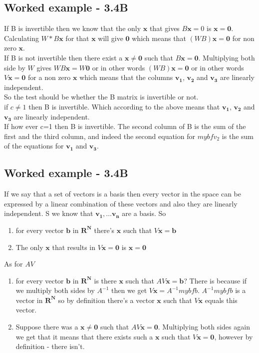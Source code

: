 \documentclass[a4paper,11pt]{article}
\newcommand{\mybf}[1]{\boldsymbol{#1}}
\begin{document}
\subsection*{Worked example - 3.4B}
If B is invertible then we know that the only $\mybf{x}$ that gives $B\mybf{x}=0$ is $\mybf{x}=\mybf{0}$. Calculating $W*B\mybf{x}$ for that $\mybf{x}$ will give $\mybf{0}$ which means that $(WB)\mybf{x}=\mybf{0}$ for non zero $\mybf{x}$. \\
If B is not invertible then there exist a $\mybf{x} \ne \mybf{0}$ such that $B\mybf{x}=\mybf{0}$. Multiplying both side by $W$ gives $WB\mybf{x}=W\mybf{0}$ or in other words $(WB)\mybf{x}=\mybf{0}$ or in other words $V\mybf{x}=\mybf{0}$ for a non zero $\mybf{x}$ which means that the columns $\mybf{v_1}$, $\mybf{v_2}$ and $\mybf{v_3}$ are linearly independent.\\
So the test should be whether the B matrix is invertible or not.\\
if $c \ne 1$ then B is invertible. Which according to the above means that $\mybf{v_1}$, $\mybf{v_2}$ and $\mybf{v_3}$ are linearly independent.\\
If how ever c=1 then B is invertible. The second column of B is the sum of the first and the third column, and indeed the second equation for $mybf{v_2}$ is the sum of the equations for $\mybf{v_1}$ and $\mybf{v_3}$.
\subsection*{Worked example - 3.4B}
If we say that a set of vectors is a basis then every vector in the space can be expressed by a linear combination of these vectors and also they are linearly independent.
S we know that $\mybf{v_1}, \dots \mybf{v_n}$ are a basis. So 
\begin{enumerate}
\item for every vector $\mybf{b}$ in $\mybf{R^N}$ there's $\mybf{x}$ such that $V\mybf{x}=\mybf{b}$
\item The only $\mybf{x}$ that results in $V\mybf{x}=\mybf{0}$ is $\mybf{x}=\mybf{0}$
\end{enumerate}
As for $AV$
\begin{enumerate}
\item for every vector $\mybf{b}$ in $\mybf{R^N}$ is there $\mybf{x}$ such that $AV\mybf{x}=\mybf{b}$? There is because if we multiply both sides by $A^{-1}$ then we get $V\mybf{x}=A^{-1}mybf{b}$. $A^{-1}mybf{b}$ is a vector in $\mybf{R^N}$ so by definition there's a vector $\mybf{x}$ such that $V\mybf{x}$ equals this vector.
\item Suppose there was a $\mybf{x} \ne \mybf{0}$ such that $AV\mybf{x}=\mybf{0}$. Multiplying both sides again we get that it means that there exists  such a $\mybf{x}$ such that $V\mybf{x}=\mybf{0}$, however by definition - there isn't.
\end{enumerate}
\end{document}
